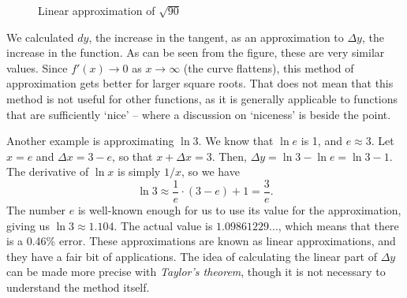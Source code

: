 \documentclass[a4paper,12pt]{article}
\begin{document}
\begin{figure}[!htbp]
\centering
{}
\caption{Linear approximation of $\sqrt{90}$}
\label{fig:linaer_approximation}
\end{figure}

We calculated $dy$, the increase in the tangent, as an approximation to $\Delta y$, the increase in the function.
As can be seen from the figure, these are very similar values.
Since $f'(x) \to 0$ as $x \to \infty$ (the curve flattens), this method of approximation gets better for larger square roots.
That does not mean that this method is not useful for other functions, as it is generally applicable to functions that are sufficiently `nice' -- where a discussion on `niceness' is beside the point.

Another example is approximating $\ln 3$.
We know that $\ln e$ is 1, and $e \approx 3$.
Let $x = e$ and $\Delta x = 3 - e$, so that $x + \Delta x = 3$.
Then, $\Delta y = \ln 3 - \ln e = \ln 3 - 1$.
The derivative of $\ln x$ is simply $1/x$, so we have
\begin{equation*}
    \ln 3 \approx \frac{1}{e} \cdot (3 - e) + 1 = \frac{3}{e}.
\end{equation*}
The number $e$ is well-known enough for us to use its value for the approximation, giving us $\ln 3 \approx 1.104$.
The actual value is $1.09861229\ldots$, which means that there is a 0.46\% error.
These approximations are known as linear approximations, and they have a fair bit of applications.
The idea of calculating the linear part of $\Delta y$ can be made more precise with \emph{Taylor's theorem}, though it is not necessary to understand the method itself.
\end{document}
